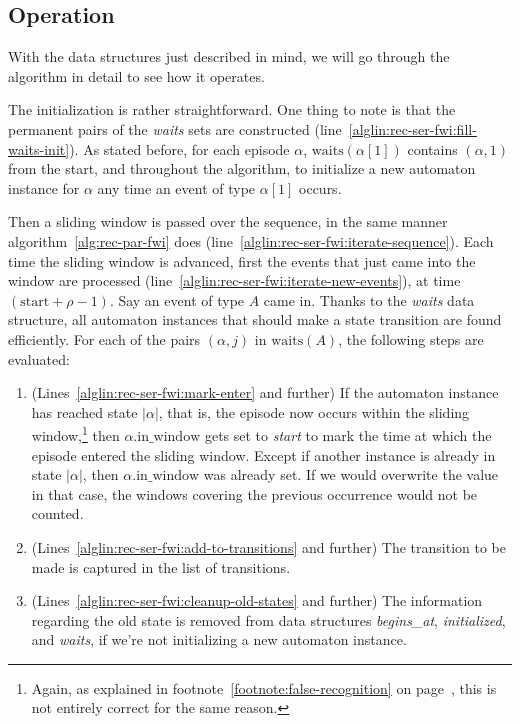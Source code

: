 \subsection{Operation}

With the data structures just described in mind, we will go through the algorithm in detail to see how it operates.

The initialization is rather straightforward. One thing to note is that the permanent pairs of the \emph{waits} sets are constructed (line~\ref{alglin:rec-ser-fwi:fill-waits-init}). As stated before, for each episode $ \alpha $, $ \text{waits}(\alpha[1]) $ contains $ (\alpha, 1) $ from the start, and throughout the algorithm, to initialize a new automaton instance for $ \alpha $ any time an event of type $ \alpha[1] $ occurs.

Then a sliding window is passed over the sequence, in the same manner algorithm~\ref{alg:rec-par-fwi} does (line~\ref{alglin:rec-ser-fwi:iterate-sequence}). Each time the sliding window is advanced, first the events that just came into the window are processed (line~\ref{alglin:rec-ser-fwi:iterate-new-events}), at time $ (\text{start} + \rho - 1) $. Say an event of type $ A $ came in. Thanks to the \emph{waits} data structure, all automaton instances that should make a state transition are found efficiently. For each of the pairs $ (\alpha, j) $ in $ \text{waits}(A) $, the following steps are evaluated:

\begin{enumerate}
\item (Lines~\ref{alglin:rec-ser-fwi:mark-enter} and further) If the automaton instance has reached state $ | \alpha | $, that is, the episode now occurs within the sliding window,\footnote{Again, as explained in footnote~\ref{footnote:false-recognition} on page~\pageref{footnote:false-recognition}, this is not entirely correct for the same reason.} then $ \alpha \text{.in\_window} $ gets set to \emph{start} to mark the time at which the episode entered the sliding window. Except if another instance is already in state $ | \alpha | $, then $ \alpha \text{.in\_window} $ was already set. If we would overwrite the value in that case, the windows covering the previous occurrence would not be counted.
\item (Lines~\ref{alglin:rec-ser-fwi:add-to-transitions} and further) The transition to be made is captured in the list of transitions.
\item (Lines~\ref{alglin:rec-ser-fwi:cleanup-old-states} and further) The information regarding the old state is removed from data structures \emph{begins\_at}, \emph{initialized}, and \emph{waits}, if we're not initializing a new automaton instance.
\end{enumerate}

